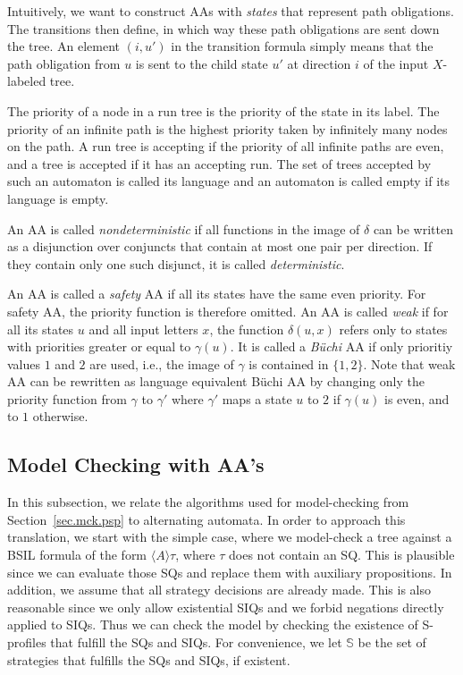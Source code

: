 \documentclass[11pt]{article}
\newcommand{\bbbbs}{{\mathbb S}}
\begin{document}
Intuitively, we want to 
construct AAs with {\em states} that represent path obligations.  
The transitions then define, in which way these path obligations 
are sent down the tree.  
An element $(i,u')$ in the transition formula 
simply means that the path obligation from $u$ is sent to 
the child state $u'$ at direction $i$ of the input $X$-labeled tree.  

The priority of a node in a run tree is the priority of 
the state in its label.
The priority of an infinite path is the highest priority taken by infinitely many nodes on the path.
A run tree is accepting if the priority of all infinite paths are even, and a tree is accepted if it has an accepting run.
The set of trees accepted by such an automaton is called its language and an automaton is called empty if its language is empty.

An AA is called {\em nondeterministic} 
if all functions in the image of $\delta$ 
can be written as a disjunction over conjuncts 
that contain at most one pair per direction.
If they contain only one such disjunct, 
it is called {\em deterministic}.

An AA is called a \emph{safety} AA if all its states have 
the same even priority.  
For safety AA, the priority function is therefore omitted.
An AA is called \emph{weak} if for all its states $u$ 
and all input letters $x$, 
the function $\delta(u,x)$ refers only to states with priorities greater 
or equal to $\gamma(u)$.  
It is called a \emph{B\"uchi} AA if only prioritiy values $1$ and $2$ 
are used, i.e., the image of $\gamma$ 
is contained in $\{1,2\}$.  
Note that weak AA can be rewritten as language equivalent B\"uchi AA 
by changing only the priority function from $\gamma$ to $\gamma'$ 
where $\gamma'$ maps a state $u$ to $2$ if $\gamma(u)$ is even, and 
to $1$ otherwise. 




\subsection{Model Checking with AA's}

In this subsection, we relate the algorithms 
used for model-checking from Section~\ref{sec.mck.psp} 
to alternating automata.
In order to approach this translation, 
we start with the simple case, where we model-check a tree
against a BSIL formula of the form $\langle A \rangle \tau$, 
where $\tau$ does not contain an SQ.
This is plausible since we can evaluate those SQs and replace them 
with auxiliary propositions.  
In addition, we assume that all strategy decisions are already made.  
This is also reasonable since we only allow existential SIQs and 
we forbid negations directly applied to SIQs.  
Thus we can check the model by checking the existence of S-profiles that 
fulfill the SQs and SIQs.  
For convenience, we let $\bbbbs$ be the set of strategies that 
fulfills the SQs and SIQs, if existent. 
\end{document}
